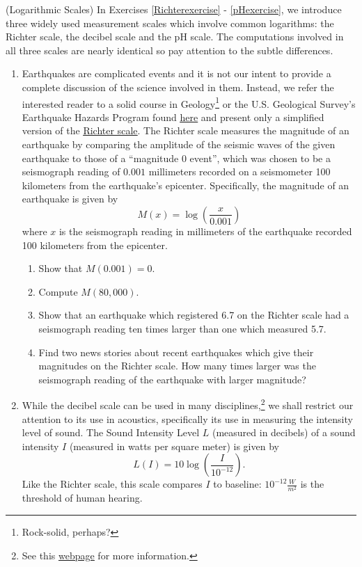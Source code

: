 \documentclass{ximera}
\begin{document}
\label{logarithmicscales}

(Logarithmic Scales) In Exercises \ref{Richterexercise} - \ref{pHexercise}, we introduce three widely used measurement scales which involve common logarithms: the Richter scale, the decibel scale and the pH scale.  The computations involved in all three scales are nearly identical so pay attention to the subtle differences. 

\begin{enumerate}
\setcounter{enumi}{\value{HW}}

\item \label{Richterexercise}   Earthquakes are complicated events and it is not our intent to provide a complete discussion of the science involved in them.  Instead, we refer the interested reader to a solid course in Geology\footnote{Rock-solid, perhaps?} or the U.S. Geological Survey's Earthquake Hazards Program found \href{http://earthquake.usgs.gov/}{\underline{here}} and present only a simplified version of the \href{http://en.wikipedia.org/wiki/Richter_scale}{\underline{Richter scale}}.  The Richter scale measures the magnitude of an earthquake by comparing the amplitude of the seismic waves of the given earthquake to those of a ``magnitude 0 event'', which was chosen to be a seismograph reading of $0.001$ millimeters recorded on a seismometer 100 kilometers from the earthquake's epicenter.  Specifically, the magnitude of an earthquake is given by \[M(x) = \log \left(\dfrac{x}{0.001}\right)\] where $x$ is the seismograph reading in millimeters of the earthquake recorded 100 kilometers from the epicenter.  

\begin{enumerate}

\item Show that $M(0.001) = 0$.
\item Compute $M(80,000)$.
\item Show that an earthquake which registered 6.7 on the Richter scale had a seismograph reading ten times larger than one which measured 5.7.
\item Find two news stories about recent earthquakes which give their magnitudes on the Richter scale.  How many times larger was the seismograph reading of the earthquake with larger magnitude?

\end{enumerate}

\item \label{decibelexercise}   While the decibel scale can be used in many disciplines,\footnote{See this  \href{http://en.wikipedia.org/wiki/Decibel}{\underline{webpage}} for more information.} we shall restrict our attention to its use in acoustics, specifically its use in measuring the intensity level of sound. The Sound Intensity Level $L$ (measured in decibels) of a sound intensity $I$ (measured in watts per square meter) is given by \[L(I) = 10\log\left( \dfrac{I}{10^{-12}} \right).\] Like the Richter scale, this scale compares $I$ to baseline: $10^{-12} \frac{W}{m^{2}}$ is the threshold of human hearing. 


\end{enumerate}
\end{document}
